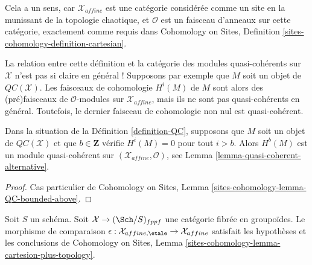 \noindent
Cela a un sens, car $\mathcal{X}_{affine}$ est une catégorie considérée
comme un site en la munissant de la topologie chaotique, et
$\mathcal{O}$ est un faisceau d'anneaux sur cette catégorie, exactement comme requis dans
Cohomology on Sites, Definition \ref{sites-cohomology-definition-cartesian}.

\medskip\noindent
La relation entre cette définition et la catégorie des modules quasi-cohérents
sur $\mathcal{X}$ n'est pas si claire en général ! Supposons par exemple
que $M$ soit un objet de $\mathit{QC}(\mathcal{X})$. Les faisceaux de cohomologie
$H^i(M)$ de $M$ sont alors des (pré)faisceaux de $\mathcal{O}$-modules sur
$\mathcal{X}_{affine}$, mais ils ne sont pas quasi-cohérents en général. Toutefois, le dernier
faisceau de cohomologie non nul est quasi-cohérent.

\begin{lemma}
\label{lemma-QC-bounded-above}
Dans la situation de la Définition \ref{definition-QC}, supposons que
$M$ soit un objet de $\mathit{QC}(\mathcal{X})$ et que $b \in \mathbf{Z}$
vérifie $H^i(M) = 0$ pour tout $i > b$.
Alors $H^b(M)$ est un module quasi-cohérent sur
$(\mathcal{X}_{affine}, \mathcal{O})$, see
Lemma \ref{lemma-quasi-coherent-alternative}.
\end{lemma}

\begin{proof}
Cas particulier de
Cohomology on Sites, Lemma \ref{sites-cohomology-lemma-QC-bounded-above}.
\end{proof}

\begin{lemma}
\label{lemma-QC-compare}
Soit $S$ un schéma. Soit $\mathcal{X} \to (\Sch/S)_{fppf}$ une catégorie
fibrée en groupoïdes. Le morphisme de comparaison
$\epsilon : \mathcal{X}_{affine, \etale} \to \mathcal{X}_{affine}$
satisfait les hypothèses et les conclusions de Cohomology on Sites, Lemma
\ref{sites-cohomology-lemma-cartesion-plus-topology}.
\end{lemma}

